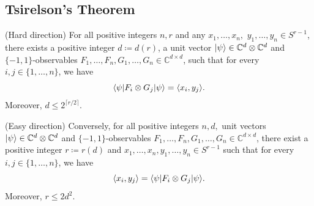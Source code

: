 \subsection{Tsirelson's Theorem}
	\begin{theo}[Tsirelson] \label{theo:Tsirelson}
		(Hard direction) For all positive integers $n, r$ and any $x_1,\dots,x_n,$ $y_1,\dots,y_n\in S^{r-1}$, there exists a positive integer $d\coloneqq d(r)$, a unit vector $\vert {\psi} \rangle\in\mathbb{C}^d\otimes\mathbb{C}^d$ and $\{-1,1\}$-observables $F_1,\dots,F_n,G_1,\dots,G_n\in \mathbb{C}^{d\times d}$, such that for every $i,j\in\{1,\dots,n\}$, we have
		\begin{equation}
			\langle {\psi} \vert F_i\otimes G_j \vert {\psi} \rangle = \langle{x_i},{y_j}\rangle.
		\end{equation}
		Moreover, $d\leq 2^{\lceil r/2 \rceil}$.
		
		(Easy direction) Conversely, for all positive integers $n,d,$ unit vectors $\vert {\psi} \rangle\in \mathbb{C}^d\otimes\mathbb{C}^d$ and $\{-1,1\}$-observables $F_1,\dots,F_n,G_1,\dots,G_n\in \mathbb{C}^{d\times d}$, there exist a positive integer $r\coloneqq r(d)$ and $x_1,\dots,x_n,y_1,\dots,y_n\in S^{r-1}$ such that for every $i,j\in\{1,\dots,n\}$, we have
		\begin{equation}
			\langle{x_i},{y_j}\rangle = \langle {\psi} \vert F_i\otimes G_j \vert {\psi} \rangle.
		\end{equation}
		Moreover, $r\leq 2d^2$.
	\end{theo}
